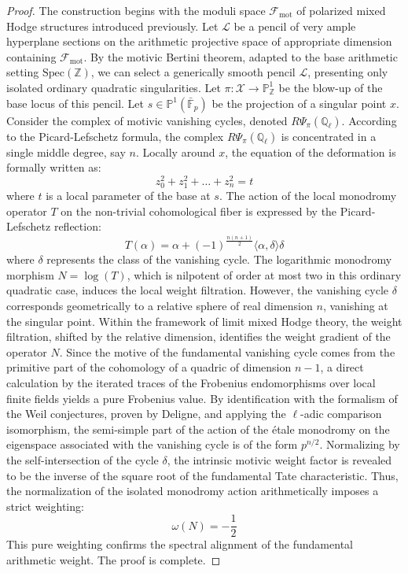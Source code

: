 \documentclass[
]{article}
\begin{document}
\begin{proof}
The construction begins with the moduli space $\mathcal{F}_{\mathrm{mot}}$ of polarized mixed Hodge structures introduced previously.
Let $\mathcal{L}$ be a pencil of very ample hyperplane sections on the arithmetic projective space of appropriate dimension containing $\mathcal{F}_{\mathrm{mot}}$.
By the motivic Bertini theorem, adapted to the base arithmetic setting $\mathrm{Spec}(\mathbb{Z})$, we can select a generically smooth pencil $\mathcal{L}$, presenting only isolated ordinary quadratic singularities.
Let $\pi : \mathcal{X} \to \mathbb{P}^1_{\mathbb{Z}}$ be the blow-up of the base locus of this pencil.
Let $s \in \mathbb{P}^1(\bar{\mathbb{F}}_p)$ be the projection of a singular point $x$.
Consider the complex of motivic vanishing cycles, denoted $R\Psi_{\pi}(\mathbb{Q}_{\ell})$.
According to the Picard-Lefschetz formula, the complex $R\Psi_{\pi}(\mathbb{Q}_{\ell})$ is concentrated in a single middle degree, say $n$.
Locally around $x$, the equation of the deformation is formally written as:
\begin{equation*}
z_0^2 + z_1^2 + \dots + z_n^2 = t
\end{equation*}
where $t$ is a local parameter of the base at $s$.
The action of the local monodromy operator $T$ on the non-trivial cohomological fiber is expressed by the Picard-Lefschetz reflection:
\begin{equation*}
T(\alpha) = \alpha + (-1)^{\frac{n(n+1)}{2}} \langle \alpha, \delta \rangle \delta
\end{equation*}
where $\delta$ represents the class of the vanishing cycle.
The logarithmic monodromy morphism $N = \log(T)$, which is nilpotent of order at most two in this ordinary quadratic case, induces the local weight filtration.
However, the vanishing cycle $\delta$ corresponds geometrically to a relative sphere of real dimension $n$, vanishing at the singular point.
Within the framework of limit mixed Hodge theory, the weight filtration, shifted by the relative dimension, identifies the weight gradient of the operator $N$.
Since the motive of the fundamental vanishing cycle comes from the primitive part of the cohomology of a quadric of dimension $n-1$, a direct calculation by the iterated traces of the Frobenius endomorphisms over local finite fields yields a pure Frobenius value.
By identification with the formalism of the Weil conjectures, proven by Deligne, and applying the $\ell$-adic comparison isomorphism, the semi-simple part of the action of the étale monodromy on the eigenspace associated with the vanishing cycle is of the form $p^{n/2}$.
Normalizing by the self-intersection of the cycle $\delta$, the intrinsic motivic weight factor is revealed to be the inverse of the square root of the fundamental Tate characteristic.
Thus, the normalization of the isolated monodromy action arithmetically imposes a strict weighting:
\begin{equation*}
\omega(N) = -\frac{1}{2}
\end{equation*}
This pure weighting confirms the spectral alignment of the fundamental arithmetic weight. The proof is complete.
\end{proof}
\end{document}
